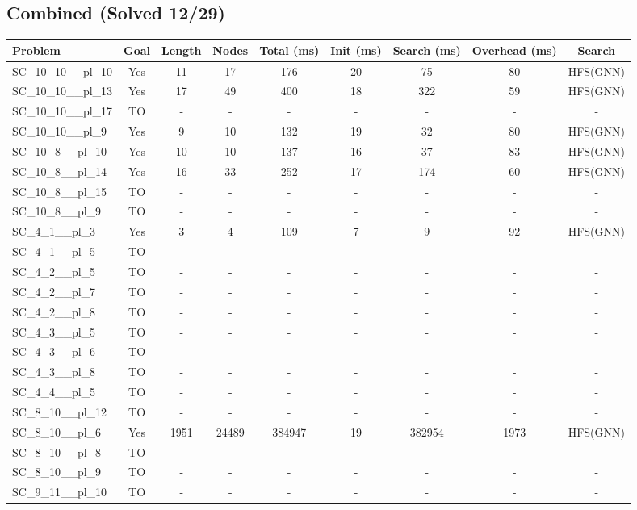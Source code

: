 \documentclass{article}
\begin{document}
\subsection*{Combined (Solved 12/29)}
\begin{tabular}{lcccccccc}
\toprule
Problem & Goal & Length & Nodes & Total (ms) & Init (ms) & Search (ms) & Overhead (ms) & Search \\
\midrule
SC\_10\_10\_\_pl\_10 & Yes & 11 & 17 & 176 & 20 & 75 & 80 & HFS(GNN) \\
SC\_10\_10\_\_pl\_13 & Yes & 17 & 49 & 400 & 18 & 322 & 59 & HFS(GNN) \\
SC\_10\_10\_\_pl\_17 & TO & - & - & - & - & - & - & - \\
SC\_10\_10\_\_pl\_9 & Yes & 9 & 10 & 132 & 19 & 32 & 80 & HFS(GNN) \\
SC\_10\_8\_\_pl\_10 & Yes & 10 & 10 & 137 & 16 & 37 & 83 & HFS(GNN) \\
SC\_10\_8\_\_pl\_14 & Yes & 16 & 33 & 252 & 17 & 174 & 60 & HFS(GNN) \\
SC\_10\_8\_\_pl\_15 & TO & - & - & - & - & - & - & - \\
SC\_10\_8\_\_pl\_9 & TO & - & - & - & - & - & - & - \\
SC\_4\_1\_\_pl\_3 & Yes & 3 & 4 & 109 & 7 & 9 & 92 & HFS(GNN) \\
SC\_4\_1\_\_pl\_5 & TO & - & - & - & - & - & - & - \\
SC\_4\_2\_\_pl\_5 & TO & - & - & - & - & - & - & - \\
SC\_4\_2\_\_pl\_7 & TO & - & - & - & - & - & - & - \\
SC\_4\_2\_\_pl\_8 & TO & - & - & - & - & - & - & - \\
SC\_4\_3\_\_pl\_5 & TO & - & - & - & - & - & - & - \\
SC\_4\_3\_\_pl\_6 & TO & - & - & - & - & - & - & - \\
SC\_4\_3\_\_pl\_8 & TO & - & - & - & - & - & - & - \\
SC\_4\_4\_\_pl\_5 & TO & - & - & - & - & - & - & - \\
SC\_8\_10\_\_pl\_12 & TO & - & - & - & - & - & - & - \\
SC\_8\_10\_\_pl\_6 & Yes & 1951 & 24489 & 384947 & 19 & 382954 & 1973 & HFS(GNN) \\
SC\_8\_10\_\_pl\_8 & TO & - & - & - & - & - & - & - \\
SC\_8\_10\_\_pl\_9 & TO & - & - & - & - & - & - & - \\
SC\_9\_11\_\_pl\_10 & TO & - & - & - & - & - & - & - \\

\end{tabular}
\end{document}
